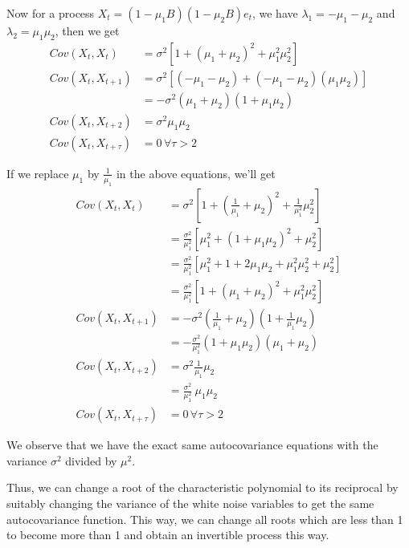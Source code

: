 \documentclass[12pt, oneside]{article}
\begin{document}
\begin{enumerate}
{    Now for a process \(X_t = (1 - \mu_1 B)(1 - \mu_2 B)e_t\), we have \(\lambda_1 = -\mu_1 - \mu_2\)
    and \(\lambda_2 = \mu_1 \mu_2\), then we get
    \begin{align*}
        Cov(X_t, X_t) &= \sigma^2 [1 + (\mu_1 + \mu_2)^2 + \mu_1^2 \mu_2^2] \\
        Cov(X_t, X_{t+1}) &= \sigma^2 [(-\mu_1-\mu_2) + (-\mu_1-\mu_2)(\mu_1 \mu_2)] \\
            &= - \sigma^2 (\mu_1 + \mu_2) (1 + \mu_1 \mu_2) \\
        Cov(X_t, X_{t+2}) &= \sigma^2 \mu_1 \mu_2 \\
        Cov(X_t, X_{t+\tau}) &= 0 \,\forall \tau > 2
    \end{align*}

    If we replace \(\mu_1\) by \(\frac{1}{\mu_1}\) in the above equations, we'll get
    \begin{align*}
        Cov(X_t, X_t) &= \sigma^2 \left[1 + \left(\frac{1}{\mu_1} + \mu_2\right)^2 + \frac{1}{\mu_1^2} \mu_2^2\right] \\
            &= \frac{\sigma^2}{\mu_1^2} \left[\mu_1^2 + \left(1 + \mu_1 \mu_2\right)^2 + \mu_2^2\right] \\
            &= \frac{\sigma^2}{\mu_1^2} \left[\mu_1^2 + 1 + 2 \mu_1 \mu_2 + \mu_1^2 \mu_2^2 + \mu_2^2\right] \\
            &= \frac{\sigma^2}{\mu_1^2} \left[1 + (\mu_1 + \mu_2)^2 + \mu_1^2 \mu_2^2\right] \\
        Cov(X_t, X_{t+1}) &= - \sigma^2 \left(\frac{1}{\mu_1} + \mu_2\right) \left(1 + \frac{1}{\mu_1} \mu_2\right) \\
            &= - \frac{\sigma^2}{\mu_1^2} \left(1 + \mu_1 \mu_2\right) \left(\mu_1 + \mu_2\right) \\
        Cov(X_t, X_{t+2}) &= \sigma^2 \frac{1}{\mu_1} \mu_2 \\
        &= \frac{\sigma^2}{\mu_1^2} ~\mu_1 \mu_2 \\
        Cov(X_t, X_{t+\tau}) &= 0 \,\forall \tau > 2
    \end{align*}

    We observe that we have the exact same autocovariance equations with the variance
    \(\sigma^2\) divided by \(\mu^2\).
    
    Thus, we can change a root of the characteristic polynomial to its reciprocal by suitably
    changing the variance of the white noise variables to get the same autocovariance function.
    This way, we can change all roots which are less than 1 to become more than 1 and obtain an
    invertible process this way.

}
\end{enumerate}
\end{document}
